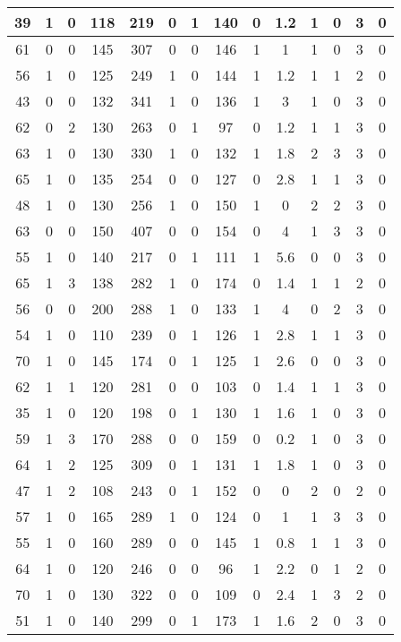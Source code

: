 \documentclass{article}
\begin{document}
\begin{longtable}{|c|c|c|c|c|c|c|c|c|c|c|c|c|c|}
39 & 1 & 0 & 118 & 219 & 0 & 1 & 140 & 0 & 1.2 & 1 & 0 & 3 & 0\\ \hline
61 & 0 & 0 & 145 & 307 & 0 & 0 & 146 & 1 & 1 & 1 & 0 & 3 & 0\\ \hline
56 & 1 & 0 & 125 & 249 & 1 & 0 & 144 & 1 & 1.2 & 1 & 1 & 2 & 0\\ \hline
43 & 0 & 0 & 132 & 341 & 1 & 0 & 136 & 1 & 3 & 1 & 0 & 3 & 0\\ \hline
62 & 0 & 2 & 130 & 263 & 0 & 1 & 97 & 0 & 1.2 & 1 & 1 & 3 & 0\\ \hline
63 & 1 & 0 & 130 & 330 & 1 & 0 & 132 & 1 & 1.8 & 2 & 3 & 3 & 0\\ \hline
65 & 1 & 0 & 135 & 254 & 0 & 0 & 127 & 0 & 2.8 & 1 & 1 & 3 & 0\\ \hline
48 & 1 & 0 & 130 & 256 & 1 & 0 & 150 & 1 & 0 & 2 & 2 & 3 & 0\\ \hline
63 & 0 & 0 & 150 & 407 & 0 & 0 & 154 & 0 & 4 & 1 & 3 & 3 & 0\\ \hline
55 & 1 & 0 & 140 & 217 & 0 & 1 & 111 & 1 & 5.6 & 0 & 0 & 3 & 0\\ \hline
65 & 1 & 3 & 138 & 282 & 1 & 0 & 174 & 0 & 1.4 & 1 & 1 & 2 & 0\\ \hline
56 & 0 & 0 & 200 & 288 & 1 & 0 & 133 & 1 & 4 & 0 & 2 & 3 & 0\\ \hline
54 & 1 & 0 & 110 & 239 & 0 & 1 & 126 & 1 & 2.8 & 1 & 1 & 3 & 0\\ \hline
70 & 1 & 0 & 145 & 174 & 0 & 1 & 125 & 1 & 2.6 & 0 & 0 & 3 & 0\\ \hline
62 & 1 & 1 & 120 & 281 & 0 & 0 & 103 & 0 & 1.4 & 1 & 1 & 3 & 0\\ \hline
35 & 1 & 0 & 120 & 198 & 0 & 1 & 130 & 1 & 1.6 & 1 & 0 & 3 & 0\\ \hline
59 & 1 & 3 & 170 & 288 & 0 & 0 & 159 & 0 & 0.2 & 1 & 0 & 3 & 0\\ \hline
64 & 1 & 2 & 125 & 309 & 0 & 1 & 131 & 1 & 1.8 & 1 & 0 & 3 & 0\\ \hline
47 & 1 & 2 & 108 & 243 & 0 & 1 & 152 & 0 & 0 & 2 & 0 & 2 & 0\\ \hline
57 & 1 & 0 & 165 & 289 & 1 & 0 & 124 & 0 & 1 & 1 & 3 & 3 & 0\\ \hline
55 & 1 & 0 & 160 & 289 & 0 & 0 & 145 & 1 & 0.8 & 1 & 1 & 3 & 0\\ \hline
64 & 1 & 0 & 120 & 246 & 0 & 0 & 96 & 1 & 2.2 & 0 & 1 & 2 & 0\\ \hline
70 & 1 & 0 & 130 & 322 & 0 & 0 & 109 & 0 & 2.4 & 1 & 3 & 2 & 0\\ \hline
51 & 1 & 0 & 140 & 299 & 0 & 1 & 173 & 1 & 1.6 & 2 & 0 & 3 & 0\\ \hline

\end{longtable}
\end{document}
